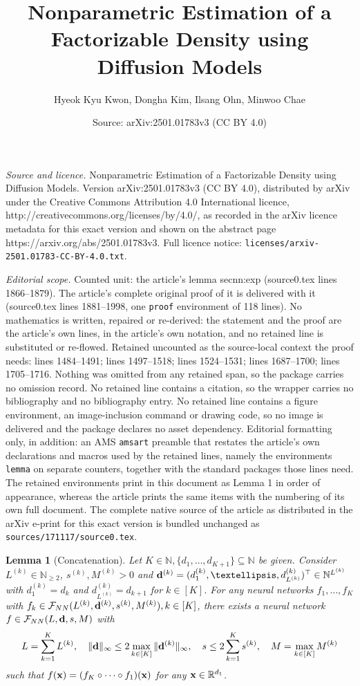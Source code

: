 \documentclass[10pt,a4paper]{amsart}
\title{Nonparametric Estimation of a Factorizable Density using Diffusion Models}
\author{Hyeok Kyu Kwon, Dongha Kim, Ilsang Ohn, Minwoo Chae}
\date{Source: arXiv:2501.01783v3 (CC BY 4.0)}
\newtheorem{lemma}{Lemma}
\newcommand{\bbN}{{\mathbb N}}
\newcommand{\bbR}{{\mathbb R}}
\newcommand{\bd}{{\bf d}}
\newcommand{\bean}{\setlength\arraycolsep{1pt}\begin{eqnarray*}}
\newcommand{\bx}{{\bf x}}
\def\cF{\mathcal F}
\newcommand{\eean}{\end{eqnarray*}}
\begin{document}
\maketitle

\noindent\emph{Source and licence.} Nonparametric Estimation of a Factorizable Density using Diffusion Models. Version arXiv:2501.01783v3 (CC BY 4.0), distributed by arXiv under the Creative Commons Attribution 4.0 International licence, http://creativecommons.org/licenses/by/4.0/, as recorded in the arXiv licence metadata for this exact version and shown on the abstract page https://arxiv.org/abs/2501.01783v3. Full licence notice: \texttt{licenses/arxiv-2501.01783-CC-BY-4.0.txt}.\par\smallskip

\noindent\textit{Editorial scope.} Counted unit: the article's lemma secnn:exp (source0.tex lines 1866--1879). The article's complete original proof of it is delivered with it (source0.tex lines 1881--1998, one \texttt{proof} environment of 118 lines). No mathematics is written, repaired or re-derived: the statement and the proof are the article's own lines, in the article's own notation, and no retained line is substituted or re-flowed.  Retained uncounted as the source-local context the proof needs: lines 1484--1491; lines 1497--1518; lines 1524--1531; lines 1687--1700; lines 1705--1716.  Nothing was omitted from any retained span, so the package carries no omission record.  No retained line contains a citation, so the wrapper carries no bibliography and no bibliography entry.  No retained line contains a figure environment, an image-inclusion command or drawing code, so no image is delivered and the package declares no asset dependency.  Editorial formatting only, in addition: an AMS \texttt{amsart} preamble that restates the article's own declarations and macros used by the retained lines, namely the environments \texttt{lemma} on separate counters, together with the standard packages those lines need.  The retained environments print in this document as Lemma 1 in order of appearance, whereas the article prints the same items with the numbering of its own full document.  The complete native source of the article as distributed in the arXiv e-print for this exact version is bundled unchanged as \texttt{sources/171117/source0.tex}.
\begin{lemma}[Concatenation]
\label{secnn:comp}
Let $K \in \bbN, \{d_1,\ldots,d_{K+1}\} \subseteq \bbN$ be given. Consider $L^{(k)} \in \bbN_{\geq 2}$, $ s^{(k)}, M^{(k)} > 0$ and $\bd^{(k)} = (d_1^{(k)},\ldots,d_{L^{(k)}}^{(k)})^{\top} \in \bbN^{L^{(k)}}$ with $d_1^{(k)} = d_{k}$ and $ d_{L^{(k)}}^{(k)} = d_{k+1}$ for $k \in [K]$. For any neural networks $f_1,\ldots,f_{K}$ with $f_k \in \cF_{\rm NN}(L^{(k)},\bd^{(k)},s^{(k)}, M^{(k)}), k \in [K]$, there exists a neural network $f \in \cF_{\rm NN}(L,\bd,s,M)$ with 
\bean
L = \sum_{k=1}^{K} L^{(k)}, \quad \| \bd \|_{\infty} \leq 2 \max_{k \in [K]} \|\bd^{(k)}\|_{\infty}, \quad s \leq 2 \sum_{k=1}^{K} s^{(k)}, \quad M = \max_{k \in [K]} M^{(k)}
\eean
such that $f(\bx) = (f_K \circ \cdots \circ f_{1})(\bx) $ for any $\bx \in \bbR^{d_1}$.
\end{lemma}
\end{document}
